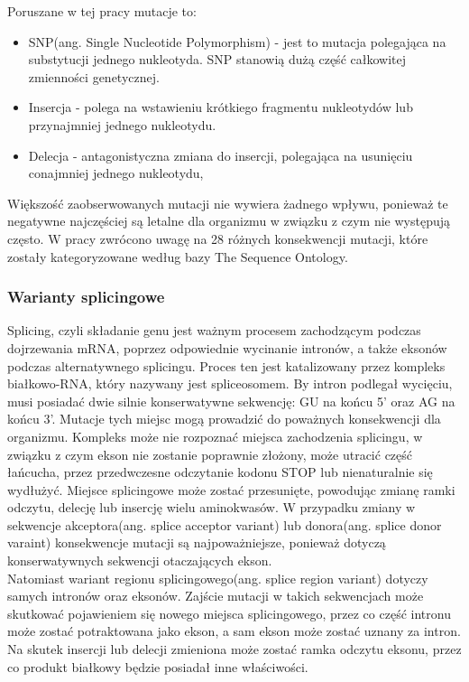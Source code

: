 \documentclass[12pt]{article}
\begin{document}
Poruszane w tej pracy mutacje to:
\begin{itemize}
	\item SNP(ang. Single Nucleotide Polymorphism) - jest to mutacja polegająca na substytucji jednego nukleotyda. SNP stanowią dużą część całkowitej zmienności genetycznej.
	\item Insercja - polega na wstawieniu krótkiego fragmentu nukleotydów lub przynajmniej jednego nukleotydu. 
	\item Delecja - antagonistyczna zmiana do insercji, polegająca na usunięciu conajmniej jednego nukleotydu,
\end{itemize}
Większość zaobserwowanych mutacji nie wywiera żadnego wpływu, ponieważ te negatywne najczęściej są letalne dla organizmu w związku z czym nie występują często. W pracy zwrócono uwagę na 28 różnych konsekwencji mutacji, które zostały kategoryzowane według bazy The Sequence Ontology. 



\subsubsection{Warianty splicingowe} \indent 

\indent Splicing, czyli składanie genu jest ważnym procesem zachodzącym podczas dojrzewania mRNA, poprzez odpowiednie wycinanie intronów, a także eksonów podczas alternatywnego splicingu. Proces ten jest katalizowany przez kompleks białkowo-RNA, który nazywany jest spliceosomem. By intron podlegał wycięciu, musi posiadać dwie silnie konserwatywne sekwencję: GU na końcu 5' oraz AG na końcu 3'. Mutacje tych miejsc mogą prowadzić do poważnych konsekwencji dla organizmu. Kompleks może nie rozpoznać miejsca zachodzenia splicingu, w związku z czym ekson nie zostanie poprawnie złożony, może utracić część łańcucha, przez przedwczesne odczytanie kodonu STOP lub nienaturalnie się wydłużyć. Miejsce splicingowe może zostać przesunięte, powodując zmianę ramki odczytu, delecję lub insercję wielu aminokwasów. 
W przypadku zmiany w sekwencje akceptora(ang. splice acceptor variant) lub donora(ang. splice donor varaint) konsekwencje mutacji są najpoważniejsze, ponieważ dotyczą konserwatywnych sekwencji otaczających ekson. \\
\indent Natomiast wariant regionu splicingowego(ang. splice region variant) dotyczy samych intronów oraz eksonów. Zajście mutacji w takich sekwencjach może skutkować pojawieniem się nowego miejsca splicingowego, przez co część intronu może zostać potraktowana jako ekson, a sam ekson może zostać uznany za intron. Na skutek insercji lub delecji zmieniona może zostać ramka odczytu eksonu, przez co produkt białkowy będzie posiadał inne właściwości. 
\end{document}
